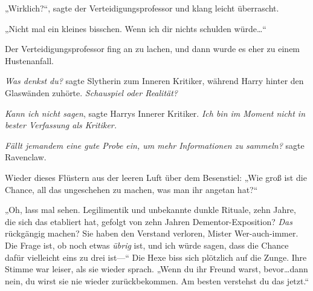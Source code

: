 „Wirklich?“, sagte der Verteidigungsprofessor und klang leicht überrascht.

„Nicht mal ein kleines bisschen. Wenn ich dir nichts schulden würde…“

Der Verteidigungsprofessor fing an zu lachen, und dann wurde es eher zu einem Hustenanfall.

\emph{Was denkst du?} sagte Slytherin zum Inneren Kritiker, während Harry hinter den Glaswänden zuhörte. \emph{Schauspiel oder Realität?}

\emph{Kann ich nicht sagen}, sagte Harrys Innerer Kritiker. \emph{Ich bin im Moment nicht in bester Verfassung als Kritiker.}

\emph{Fällt jemandem eine gute Probe ein, um mehr Informationen zu sammeln?} sagte Ravenclaw.

Wieder dieses Flüstern aus der leeren Luft über dem Besenstiel: „Wie groß ist die Chance, all das ungeschehen zu machen, was man ihr angetan hat?“

„Oh, lass mal sehen. Legilimentik und unbekannte dunkle Rituale, zehn Jahre, die sich das etabliert hat, gefolgt von zehn Jahren Dementor-Exposition? \emph{Das} rückgängig machen? Sie haben den Verstand verloren, Mister Wer-auch-immer. Die Frage ist, ob noch etwas \emph{übrig} ist, und ich würde sagen, dass die Chance dafür vielleicht eins zu drei ist—“ Die Hexe biss sich plötzlich auf die Zunge. Ihre Stimme war leiser, als sie wieder sprach. „Wenn du ihr Freund warst, bevor…dann nein, du wirst sie nie wieder zurückbekommen. Am besten verstehst du das jetzt.“

